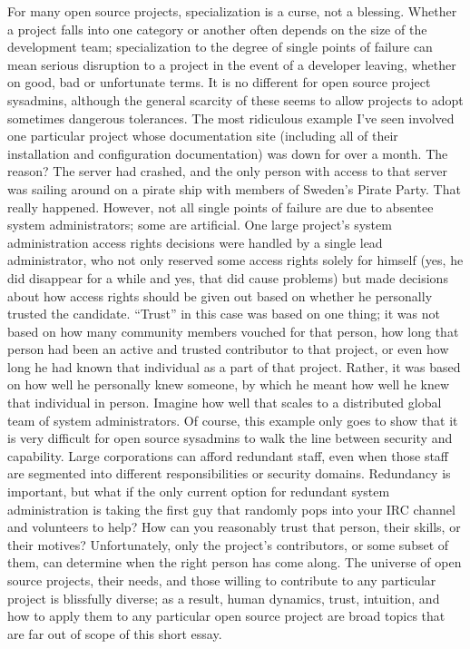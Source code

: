 For many open source projects, specialization is a curse, not a blessing.
Whether a project falls into one category or another often depends on the size
of the development team; specialization to the degree of single points of
failure can mean serious disruption to a project in the event of a developer
leaving, whether on good, bad or unfortunate terms. It is no different for open
source project sysadmins, although the general scarcity of these seems to allow
projects to adopt sometimes dangerous tolerances.
The most ridiculous example I’ve seen involved one particular project whose
documentation site (including all of their installation and configuration
documentation) was down for over a month. The reason? The server had crashed,
and the only person with access to that server was sailing around on a pirate
ship with members of Sweden’s Pirate Party. That really happened.
However, not all single points of failure are due to absentee system
administrators; some are artificial. One large project’s system administration
access rights decisions were handled by a single lead administrator, who not
only reserved some access rights solely for himself (yes, he did disappear for a
while and yes, that did cause problems) but made decisions about how access
rights should be given out based on whether he personally trusted the candidate.
“Trust” in this case was based on one thing; it was not based on how many
community members vouched for that person, how long that person had been an
active and trusted contributor to that project, or even how long he had known
that individual as a part of that project. Rather, it was based on how well he
personally knew someone, by which he meant how well he knew that individual in
person. Imagine how well that scales to a distributed global team of system
administrators.
Of course, this example only goes to show that it is very difficult for open
source sysadmins to walk the line between security and capability. Large
corporations can afford redundant staff, even when those staff are segmented
into different responsibilities or security domains. Redundancy is important,
but what if the only current option for redundant system administration is
taking the first guy that randomly pops into your IRC channel and volunteers to
help? How can you reasonably trust that person, their skills, or their motives?
Unfortunately, only the project’s contributors, or some subset of them, can
determine when the right person has come along. The universe of open source
projects, their needs, and those willing to contribute to any particular project
is blissfully diverse; as a result, human dynamics, trust, intuition, and how to
apply them to any particular open source project are broad topics that are far
out of scope of this short essay.

